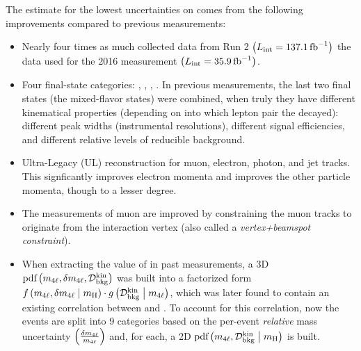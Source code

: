 The estimate for the lowest uncertainties on \mH comes from the following improvements compared to previous measurements:
\begin{itemize}
    \item Nearly four times as much collected data from Run 2 $\left( L_\text{int} = 137.1\,\text{fb}^{\text{$-$}1} \right)$ \vs the data used for the 2016 measurement $\left( L_\text{int} = 35.9\,\text{fb}^{\text{$-$}1} \right)$.
    \item Four final-state categories: \fourmu, \foure, \twoetwomu, \twomutwoe.
    In previous measurements, the last two final states (the mixed-flavor states) were combined, when truly they have different kinematical properties (depending on into which lepton pair the \Zone decayed):
    different peak widths (instrumental resolutions), different signal efficiencies, and different relative levels of reducible background.
    \item Ultra-Legacy (UL) reconstruction for muon, electron, photon, and jet tracks.
    This signficantly improves electron momenta and improves the other particle momenta, though to a lesser degree.
    \item The measurements of muon \pt are improved by constraining the muon tracks to originate from the interaction vertex (also called a \emph{vertex+beamspot constraint}).
    \item When extracting the value of \mH in past measurements, a 3D $\text{pdf} \left( m_{4\ell}, \delta m_{4\ell}, \mathcal{D}^{\text{kin}}_{\text{bkg}} \right)$ was built into a factorized form
    $f \left( m_{4\ell}, \delta m_{4\ell} \; \middle| \;{} m_{\mathrm{H}} \right)   \cdot   g\left( \mathcal{D}^{\text{kin}}_{\text{bkg}} \; \middle| \;{} m_{4\ell} \right)$,
    which was later found to contain an existing correlation between \mfourlerr and \Dkinbkg.
    To account for this correlation, now the events are split into 9 categories based on the per-event \emph{relative} mass uncertainty $\left( \frac{\delta m_{4\ell}}{m_{4\ell}} \right)$ and, for each, a 2D $\text{pdf} \left( m_{4\ell}, \mathcal{D}^{\text{kin}}_{\text{bkg}} \; \middle| \;{} m_{\mathrm{H}} \right)$ is built.

\end{itemize}
